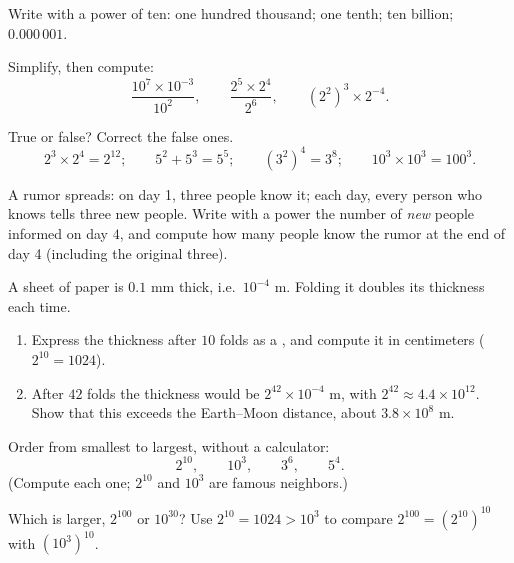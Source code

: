 \begin{exercise}[$\star$]\label{exo:g8:powers:5}
Write with a power of ten: one hundred thousand; one tenth; ten
billion; $0.000\,001$.
\end{exercise}

\begin{exercise}[$\star$]\label{exo:g8:powers:6}
Simplify, then compute:
\[
\frac{10^7 \times 10^{-3}}{10^2},
\qquad
\frac{2^5 \times 2^4}{2^6},
\qquad
\left(2^2\right)^3 \times 2^{-4} .
\]
\end{exercise}

\begin{exercise}[$\star$]\label{exo:g8:powers:7}
True or false? Correct the false ones.
\[
2^3 \times 2^4 = 2^{12}; \qquad
5^2 + 5^3 = 5^5; \qquad
(3^2)^4 = 3^8; \qquad
10^3 \times 10^3 = 100^3 .
\]
\end{exercise}

\begin{exercise}[$\star\star$]\label{exo:g8:powers:8}
A rumor spreads: on day 1, three people know it; each day, every
person who knows tells three new people. Write with a power the number
of \emph{new} people informed on day $4$, and compute how many people
know the rumor at the end of day 4 (including the original three).
\end{exercise}

\begin{exercise}[$\star\star$]\label{exo:g8:powers:9}
A sheet of paper is $0.1$ mm thick, i.e.\ $10^{-4}$ m. Folding it
doubles its thickness each time.
\begin{enumerate}
  \item Express the thickness after $10$ folds as a , and
        compute it in centimeters ($2^{10} = 1024$).
  \item After $42$ folds the thickness would be
        $2^{42} \times 10^{-4}$ m, with $2^{42} \approx 4.4 \times
        10^{12}$. Show that this exceeds the Earth--Moon distance,
        about $3.8 \times 10^8$ m.
\end{enumerate}
\end{exercise}

\begin{exercise}[$\star\star$]\label{exo:g8:powers:10}
Order from smallest to largest, without a calculator:
\[
2^{10}, \qquad 10^3, \qquad 3^6, \qquad 5^4 .
\]
(Compute each one; $2^{10}$ and $10^3$ are famous neighbors.)
\end{exercise}

\begin{exercise}[$\star\star\star$]\label{exo:g8:powers:11}
Which is larger, $2^{100}$ or $10^{30}$? Use
$2^{10} = 1024 > 10^3$ to compare
$2^{100} = \left(2^{10}\right)^{10}$ with
$\left(10^3\right)^{10}$.
\end{exercise}

